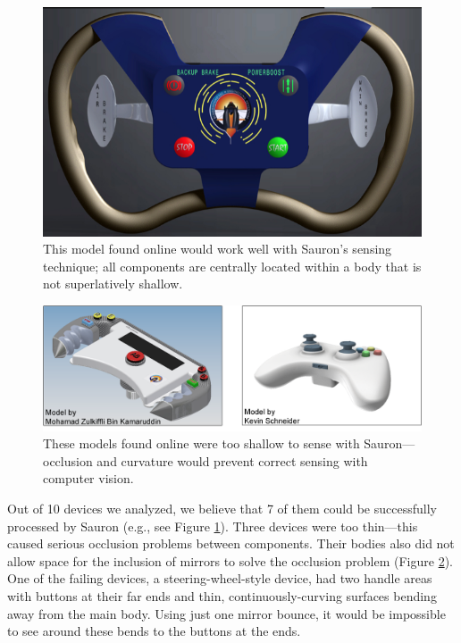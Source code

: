     \begin{figure}
\centering
\includegraphics[width=\textwidth]{figures/sauron/reasonable-model.png}
\caption{This model found online would work well with Sauron's sensing technique; all components are centrally located within a body that is not superlatively shallow.}
\label{fig:sauron-wouldwork}
\end{figure}

    \begin{figure}
\centering
\includegraphics[width=\textwidth]{figures/sauron/shallow-models.png}
\caption{These models found online were too shallow to sense with Sauron---occlusion and curvature would prevent correct sensing with computer vision.}
\label{fig:sauron-premade}
\end{figure}

    Out of 10 devices we analyzed, we believe that 7 of them could be successfully processed by Sauron (e.g., see Figure \ref{fig:sauron-wouldwork}). Three devices were too thin---this caused serious occlusion problems between components. Their bodies also did not allow space for the inclusion of mirrors to solve the occlusion problem (Figure \ref{fig:sauron-premade}). One of the failing devices, a steering-wheel-style device, had two handle areas with buttons at their far ends and thin, continuously-curving surfaces bending away from the main body. Using just one mirror bounce, it would be impossible to see around these bends to the buttons at the ends.


